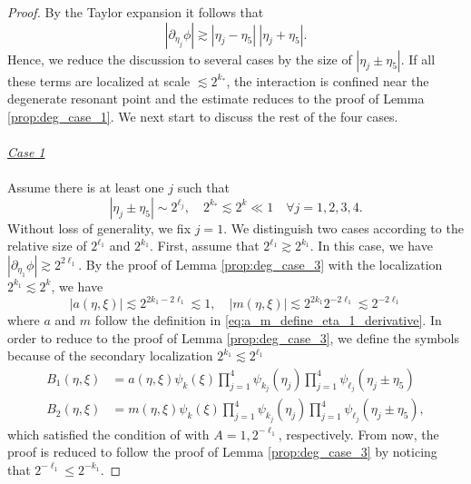\documentclass[reqno,english,11pt]{amsart}
\theoremstyle{definition}
\numberwithin{equation}{section}
\begin{document}
\begin{proof}
By the Taylor expansion it follows that
\begin{equation}
    |\partial_{\eta_j}\phi| \gtrsim \left|\eta_j-\eta_5\right| \ \left|\eta_j+\eta_5\right|. 
\end{equation}
Hence, we reduce the discussion to several cases by the size of $|\eta_j\pm\eta_5|$. If all these terms are localized at scale $\lesssim 2^{k_*}$, the interaction is confined near the degenerate resonant point and the estimate reduces to the proof of Lemma  \ref{prop:deg_case_1}. We next start to discuss the rest of the four cases.
\\\\
\noindent
\underline{\textit{Case 1}}
\\\\
\noindent 
Assume there is at least one $j$ such that
$$|\eta_j\pm \eta_5|\sim 2^{\ell_j},\quad 2^{k_*}\lesssim 2^k\ll 1\quad \forall j=1,2,3,4.$$
Without loss of generality, we fix $j=1$. We distinguish two cases according to the relative size of $2^{\ell_1}$ and $2^{k_1}$. First, assume that $2^{\ell_1}\gtrsim 2^{k_1}$. In this case, we have $|\partial_{\eta_1}\phi|\gtrsim 2^{2\ell_1}$. By the proof of Lemma  \ref{prop:deg_case_3} with the localization $2^{k_1}\lesssim 2^{k}$, we have 
$$\left|a(\eta,\xi)\right| \lesssim 2^{2k_1-2\ell_1}\lesssim 1,\quad \left|m(\eta,\xi)\right| \lesssim 2^{2k_1}2^{-2\ell_1}\lesssim  2^{-2\ell_1}$$
where $a$ and $m$ follow the definition in \eqref{eq:a_m_define_eta_1_derivative}.
In order to reduce to the proof of Lemma  \ref{prop:deg_case_3}, we define the symbols because of the secondary  localization $2^{k_1}\lesssim 2^{\ell_1}$
  \begin{align}
  B_1(\eta,\xi) &= a(\eta,\xi)
  \psi_k(\xi)\prod^4_{j=1}\psi_{k_j}(\eta_j)\prod^{4}_{j=1}
  \psi_{\ell_j}(\eta_j\pm\eta_5)\label{eq:B_1_deg_case_5_case_2}\\
  B_2(\eta,\xi) &= m(\eta,\xi)
  \psi_k(\xi)\prod^4_{j=1}\psi_{k_j}(\eta_j)\prod^{4}_{j=1}
  \psi_{\ell_j}(\eta_j\pm\eta_5),\label{eq:B_2_deg_case_5_case_2}
  \end{align}
which satisfied the condition of \cite[Lemma B.3]{Morgan} with $A=1,2^{-\ell_1}$, respectively. From now, the proof is reduced to follow the proof of Lemma \ref{prop:deg_case_3} by noticing that $2^{-\ell_1}\leq 2^{-k_1}$. 


\end{proof}
\end{document}
